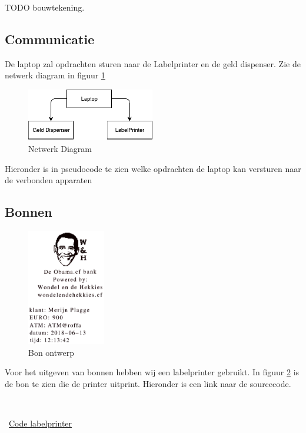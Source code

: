 \documentclass{article}
\begin{document}
TODO bouwtekening.

\subsection{Communicatie}

De laptop zal opdrachten sturen naar de Labelprinter en de geld dispenser.
Zie de netwerk diagram in figuur \ref{fig: Netwerk Diagram}

\begin{figure}[!h]
        \centering
        \includegraphics[height=0.9in]{netwerk_diagram.pdf}
        \caption{Netwerk Diagram}
        \label{fig: Netwerk Diagram}
\end{figure}

Hieronder is in pseudocode te zien welke opdrachten de laptop kan versturen naar de verbonden apparaten 



\newpage
\subsection{Bonnen}

\begin{figure}
        \centering
        \includegraphics[height=2.0in]{obama_bon.pdf}
       \caption{Bon ontwerp}
       \label{fig: Bon ontwerp}
\end{figure}

Voor het uitgeven van bonnen hebben wij een labelprinter gebruikt.
In figuur \ref{fig: Bon ontwerp} is de bon te zien die de printer uitprint.
Hieronder is een link naar de sourcecode.

\vspace{1mm}\

\Mundus~\href{https://github.com/Gewad/Project4Bankalicious/tree/master/bonnetjesPrinten}{Code labelprinter}
\end{document}
